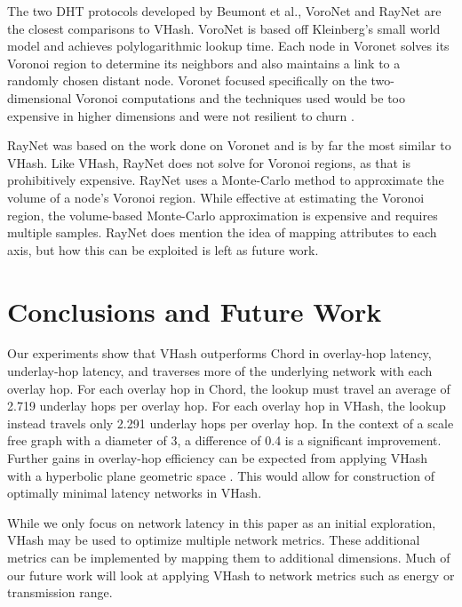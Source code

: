 \documentclass[10pt, conference, letterpaper]{IEEEtran}
\begin{document}
The two DHT protocols developed by Beumont et al., VoroNet \cite{voronet} and RayNet \cite{raynet} are the closest comparisons to VHash.
VoroNet is based off Kleinberg's small world model \cite{kleinberg2000navigation} and achieves polylogarithmic lookup time.  
Each node in Voronet solves its Voronoi region to determine its neighbors and also maintains a link to a randomly chosen distant node.
Voronet focused specifically on the two-dimensional Voronoi computations and the techniques used would be too expensive in higher dimensions and were not resilient to churn  \cite{raynet}.

RayNet \cite{raynet} was based on the work done on Voronet and is by far the most similar to VHash.  
Like VHash, RayNet does not solve for Voronoi regions, as that is prohibitively expensive.  
RayNet uses a Monte-Carlo method to approximate the volume of a node's Voronoi region.  
While effective at estimating the Voronoi region,  the volume-based Monte-Carlo approximation is expensive and requires multiple samples. 
RayNet does mention the idea of mapping attributes to each axis, but how this can be exploited is left as future work.
 

\section{Conclusions and Future Work}
\label{conclusions}

Our experiments show that VHash outperforms Chord in overlay-hop latency, underlay-hop latency, and traverses more of the underlying network with each overlay hop. 
For each overlay hop in Chord, the lookup must travel an average of 2.719 underlay hops per overlay hop.
For each overlay hop in VHash, the lookup instead travels only 2.291 underlay hops per overlay hop.
In the context of a scale free graph with a diameter of 3, a difference of 0.4 is a significant improvement. 
Further gains in overlay-hop efficiency can be expected from applying VHash with a hyperbolic plane geometric space \cite{papadopoulos2010greedy}.
This would allow for construction of optimally minimal latency networks in VHash.

While we only focus on network latency in this paper as an initial exploration, VHash may be used to optimize multiple network metrics.
These additional metrics can be implemented by mapping them to additional dimensions.
Much of our future work will look at applying VHash to network metrics such as energy or transmission range.
 
\end{document}

